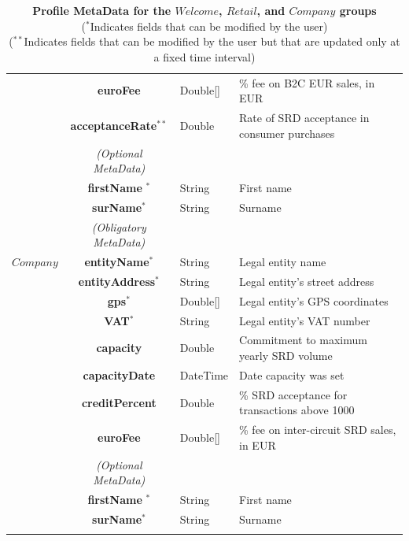 \begin{table}[H]
\begin{centering}
{\begin{tabular}{ r | c | l | l }
			& {\bf euroFee}				&Double[]	& \% fee on B2C EUR sales, in EUR \\
			& {\bf acceptanceRate}$^{**}$	&Double	& Rate of SRD acceptance in consumer purchases\\
\cline{2-2}
			 & \emph{(Optional MetaData)}& & \\
\cline{2-2}
			& {\bf firstName	}$^*$			&String	& First name \\
			& {\bf surName}$^*$			&String	& Surname \\
\Xhline{1.5pt}
			& \emph{(Obligatory MetaData)} & & \\
\cline{2-2}
$Company$	& {\bf entityName}$^*$		&String	& Legal entity name \\
			& {\bf entityAddress}$^*$		&String	& Legal entity's street address \\
			& {\bf gps}$^*$				&Double[]	& Legal entity's GPS coordinates \\
			& {\bf VAT}$^*$				&String	& Legal entity's VAT number \\
			& {\bf capacity}				&Double	& Commitment to maximum yearly SRD volume \\
			& {\bf capacityDate}			&DateTime & Date capacity was set \\
			& {\bf creditPercent}			&Double	& \% SRD acceptance for transactions above 1000 \\
			& {\bf euroFee}				&Double[]	& \% fee on inter-circuit SRD sales, in EUR \\
\cline{2-2}
			 & \emph{(Optional MetaData)}& & \\
\cline{2-2}
			& {\bf firstName	}$^*$			&String & First name \\
			& {\bf surName}$^*$			&String & Surname \\
\Xhline{1.5pt}
\end{tabular}
}
\caption{\small\textbf{Profile MetaData for the $Welcome$, $Retail$, and $Company$ groups}\\
($^*$Indicates fields that can be modified by the user)\\
($^{**}$Indicates fields that can be modified by the user but that are updated only at a fixed time interval)}
\label{tab:ProfileMetaData1}
\end{centering}
\end{table}


